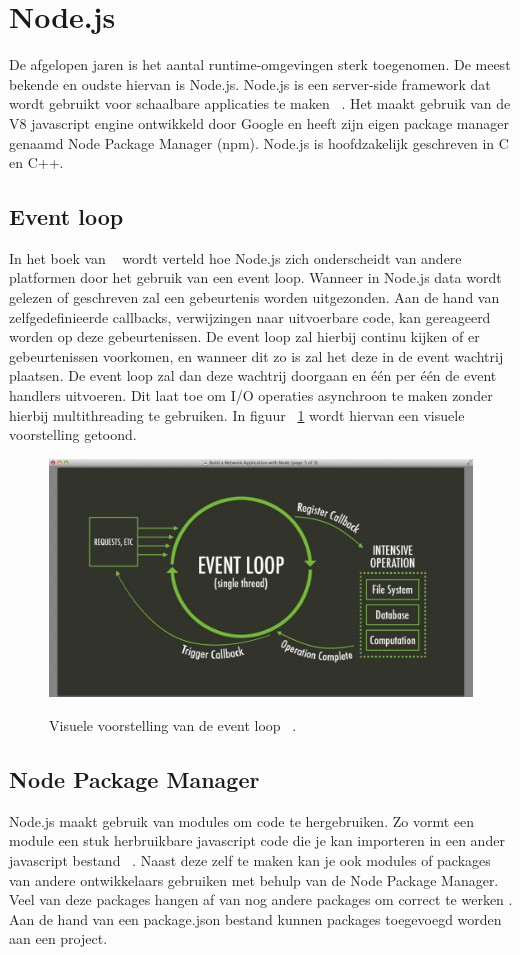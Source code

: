 \section{Node.js}
De afgelopen jaren is het aantal runtime-omgevingen sterk toegenomen. De meest bekende en oudste hiervan is Node.js.
Node.js is een server-side framework dat wordt gebruikt voor schaalbare applicaties te maken ~\autocite{Gackenheimer2013}.
Het maakt gebruik van de V8 javascript engine ontwikkeld door Google en heeft zijn eigen package manager genaamd Node Package Manager (npm).
Node.js is hoofdzakelijk geschreven in C en C++.

\subsection{Event loop}
In het boek van ~\textcite{Ali2013} wordt verteld hoe Node.js zich onderscheidt van andere platformen door het gebruik van een event loop.
Wanneer in Node.js data wordt gelezen of geschreven zal een gebeurtenis worden uitgezonden. 
Aan de hand van zelfgedefinieerde callbacks, verwijzingen naar uitvoerbare code, kan gereageerd worden op deze gebeurtenissen. 
De event loop zal hierbij continu kijken of er gebeurtenissen voorkomen, en wanneer dit zo is zal het deze in de event wachtrij plaatsen.
De event loop zal dan deze wachtrij doorgaan en één per één de event handlers uitvoeren. 
Dit laat toe om I/O operaties asynchroon te maken zonder hierbij multithreading te gebruiken.
In figuur ~\ref{fig:eventloop} wordt hiervan een visuele voorstelling getoond.
\begin{figure}[h]
    \centering
    \includegraphics[width=.9\textwidth]{graphics/eventloop.png}
    \caption{\label{fig:eventloop}}Visuele voorstelling van de event loop ~\autocite{Luxembourg2023}.
\end{figure}

\subsection{Node Package Manager}
Node.js maakt gebruik van modules om code te hergebruiken. 
Zo vormt een module een stuk herbruikbare javascript code 
die je kan importeren in een ander javascript bestand ~\autocite{Semah2022}.
Naast deze zelf te maken kan je ook modules of packages van andere ontwikkelaars gebruiken met behulp van de Node Package Manager.
Veel van deze packages hangen af van nog andere packages om correct te werken \autocite{kula2017}.
Aan de hand van een package.json bestand kunnen packages toegevoegd worden aan een project.

